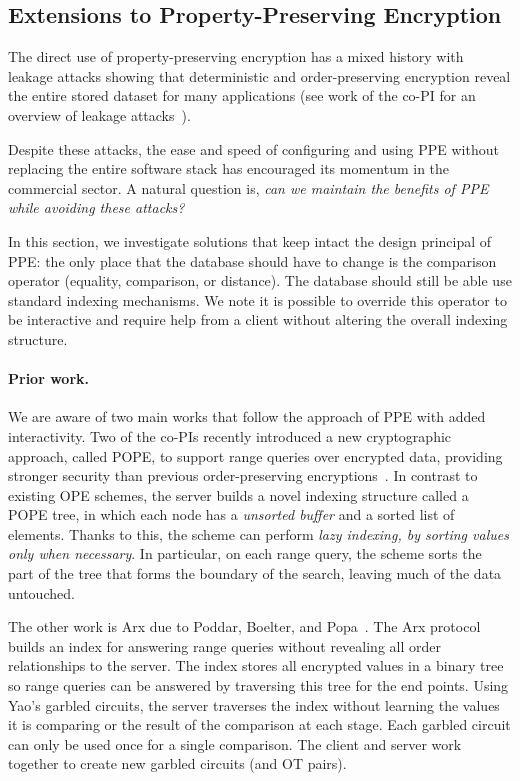 
\subsection{Extensions to Property-Preserving Encryption}
The direct use of property-preserving encryption has a mixed history
with leakage attacks showing that deterministic and order-preserving
encryption reveal the entire stored dataset for many applications (see
work of the co-PI for an overview of leakage
attacks~\cite{SP:FVYSHG17}).

Despite these attacks, the ease and speed of configuring and using PPE
without replacing the entire software stack has encouraged its momentum
in the commercial sector. A natural question is, \emph{can we maintain
the benefits of PPE while avoiding these attacks?}

In this section, we investigate solutions that keep intact
the design principal of PPE: the only place that the database should
have to change is the comparison operator (equality, comparison, or
distance).  The database should still be able use standard indexing
mechanisms.  We note it is possible to override this operator to be
interactive and require help from a client without altering the overall
indexing structure.

\paragraph{Prior work.}
We are aware of two main works that follow the approach of PPE with added interactivity.  Two of the co-PIs recently introduced a new cryptographic approach, called POPE, to
support range queries over encrypted data, providing stronger security than
previous order-preserving encryptions~\cite{CCS:RACY16}.  In contrast to
existing OPE schemes, the server builds a novel indexing structure called a
POPE tree, in which each node has a {\it unsorted buffer} and a sorted list of
elements.  Thanks to this, the scheme can perform {\it lazy indexing, by
sorting values only when necessary}. In particular, on each range query, the
scheme sorts the part of the tree that forms the boundary of the search,
leaving much of the data untouched.

The other work is Arx due to Poddar, Boelter, and Popa~\cite{EPRINT:PodBoePop16}.  The
Arx protocol builds an index for answering
range queries without revealing all order relationships to the
server. The index stores all encrypted values in a binary
tree so range queries can be answered by traversing this
tree for the end points. Using Yao's garbled circuits, the
server traverses the index without learning the values it is
comparing or the result of the comparison at each stage.  Each garbled circuit can only be used once for a single comparison.  The client and server work together to create new garbled circuits (and OT pairs).

